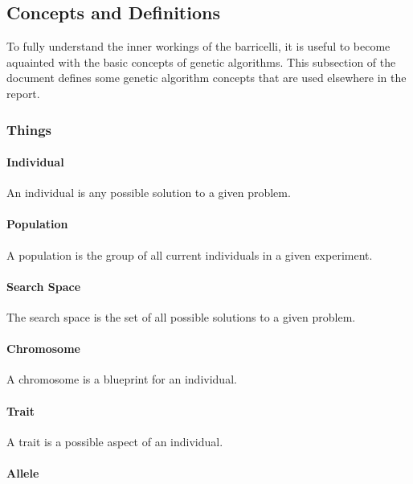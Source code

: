 \subsection{Concepts and Definitions}

To fully understand the inner workings of the \Gls{barricelli}, it is useful to become aquainted with the basic concepts of genetic algorithms.
This subsection of the document defines some genetic algorithm concepts that are used elsewhere in the report.

\subsubsection{Things}

\paragraph{Individual}

An individual is any possible solution to a given problem.

\paragraph{Population}

A population is the group of all current individuals in a given experiment.

\paragraph{Search Space}

The search space is the set of all possible solutions to a given problem.

\paragraph{Chromosome}

A chromosome is a blueprint for an individual.

\paragraph{Trait}

A trait is a possible aspect of an individual.

\paragraph{Allele}

